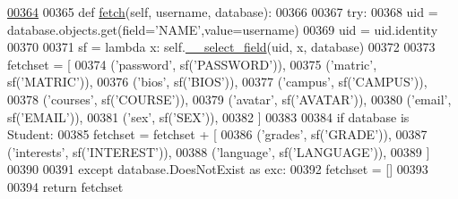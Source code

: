 \begin{DoxyCode}
\hypertarget{classProfile_1_1ProfileUnit_1_1PersProfile_l00364}{}\hyperlink{classProfile_1_1ProfileUnit_1_1PersProfile_aca301abc09bc12a7cf0a61437f941a8a}{00364} 
00365     \textcolor{keyword}{def }\hyperlink{classProfile_1_1ProfileUnit_1_1PersProfile_aca301abc09bc12a7cf0a61437f941a8a}{fetch}(self, username, database):
00366 
00367         \textcolor{keywordflow}{try}:
00368             uid = database.objects.get(field=\textcolor{stringliteral}{'NAME'},value=username)
00369             uid = uid.identity
00370 
00371             sf = \textcolor{keyword}{lambda} x: self.\hyperlink{classProfile_1_1ProfileUnit_1_1PersProfile_a48bc2c04d89772752559fc19dc79f321}{\_\_select\_field}(uid, x, database)
00372 
00373             fetchset = [
00374                     (\textcolor{stringliteral}{'password'},    sf(\textcolor{stringliteral}{'PASSWORD'})),
00375                     (\textcolor{stringliteral}{'matric'},      sf(\textcolor{stringliteral}{'MATRIC'})),
00376                     (\textcolor{stringliteral}{'bios'},        sf(\textcolor{stringliteral}{'BIOS'})),
00377                     (\textcolor{stringliteral}{'campus'},      sf(\textcolor{stringliteral}{'CAMPUS'})),
00378                     (\textcolor{stringliteral}{'courses'},     sf(\textcolor{stringliteral}{'COURSE'})),
00379                     (\textcolor{stringliteral}{'avatar'},      sf(\textcolor{stringliteral}{'AVATAR'})),
00380                     (\textcolor{stringliteral}{'email'},       sf(\textcolor{stringliteral}{'EMAIL'})),
00381                     (\textcolor{stringliteral}{'sex'},         sf(\textcolor{stringliteral}{'SEX'})),
00382             ]
00383 
00384             \textcolor{keywordflow}{if} database \textcolor{keywordflow}{is} Student:
00385                 fetchset = fetchset + [     
00386                     (\textcolor{stringliteral}{'grades'},      sf(\textcolor{stringliteral}{'GRADE'})),
00387                     (\textcolor{stringliteral}{'interests'},   sf(\textcolor{stringliteral}{'INTEREST'})),
00388                     (\textcolor{stringliteral}{'language'},    sf(\textcolor{stringliteral}{'LANGUAGE'})),
00389                 ]
00390 
00391         \textcolor{keywordflow}{except} database.DoesNotExist \textcolor{keyword}{as} exc:
00392             fetchset = []
00393 
00394         \textcolor{keywordflow}{return} fetchset

\end{DoxyCode}
